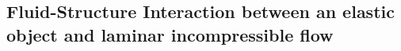 \subsection{Fluid-Structure Interaction between an elastic object and laminar incompressible flow}











